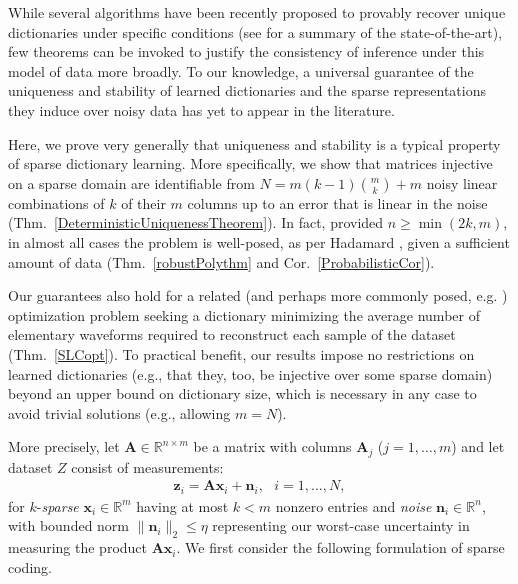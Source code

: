 While several algorithms have been recently proposed to provably recover unique dictionaries under specific conditions (see \cite[Sec.~I-E]{Sun16} for a summary of the state-of-the-art), few theorems can be invoked to justify the consistency of inference under this model of data more broadly. To our knowledge, a universal guarantee of the uniqueness and stability of learned dictionaries and the sparse representations they induce over noisy data has yet to appear in the literature.

Here, we prove very generally that uniqueness and stability is a typical property of sparse dictionary learning. More specifically, we show that matrices injective on a sparse domain are identifiable from \mbox{$N = m(k-1){m \choose k} + m$} noisy linear combinations of $k$ of their $m$ columns up to an error that is linear in the noise (Thm.~\ref{DeterministicUniquenessTheorem}). In fact, provided $n \geq \min(2k,m)$, in almost all cases the problem is well-posed, as per Hadamard \cite{Hadamard1902}, given a sufficient amount of data (Thm.~\ref{robustPolythm} and Cor.~\ref{ProbabilisticCor}). 

Our guarantees also hold for a related (and perhaps more commonly posed, e.g. \cite{rehnsommer2007}) optimization problem seeking a dictionary minimizing the average number of elementary waveforms required to reconstruct each sample of the dataset (Thm.~\ref{SLCopt}). To practical benefit, our results impose no restrictions on learned dictionaries (e.g., that they, too, be injective over some sparse domain) beyond an upper bound on dictionary size, which is necessary in any case to avoid trivial solutions (e.g., allowing $m = N$). %

More precisely, let $\mathbf{A} \in \mathbb R^{n \times m}$ be a matrix with columns $\mathbf{A}_j$ ($j = 1,\ldots,m$) and let dataset $Z$ consist of measurements:
\begin{align}\label{LinearModel}
\mathbf{z}_i = \mathbf{A}\mathbf{x}_i + \mathbf{n}_i,\ \ \  \text{$i=1,\ldots,N$},
\end{align}
for $k$-\emph{sparse} $\mathbf{x}_i \in \mathbb{R}^m$ having at most $k<m$ nonzero entries and \emph{noise} $\mathbf{n}_i \in \mathbb{R}^n$, with bounded norm $\| \mathbf{n}_i \|_2 \leq  \eta$ representing our worst-case uncertainty in measuring the product $\mathbf{A}\mathbf{x}_i$. We first consider the following formulation of sparse coding.

